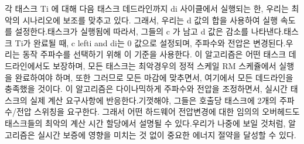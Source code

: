 \documentclass[11pt
  , a4paper
  , article
  , oneside
]{memoir}
\begin{document}
각 태스크 Ti 에 대해 다음 태스크 데드라인까지 di 사이클에서 실행되는 한, 우리는 최악의 시나리오에 보조를 맞추고 있다. 그래서, 우리는 d 값의 합을 사용하여 실행 속도를 설정한다.태스크가 실행됨에 따라서, 그들의 c 가 남고 d 값은 감소를 나타낸다.태스크 Ti가 완료될 때, c lefti and di는 0 값으로 설정되며, 주파수와 전압은 변경된다.우리는 동작 주파수를 선택하기 위해 이 기준을 사용한다. 이 알고리즘은 어떤 태스크 데드라인에서도 보장하며, 모든 태스크는 최악경우의 정적 스케일 RM 스케쥴에서 실행을 완료하여야 하며, 또한 그러므로 모든 마감에 맞추면서, 여기에서 모든 데드라인을 충족했을 것이다.
이 알고리즘은 다이나믹하게 주파수와 전압을 조정하면서, 실시간 태스크의 실제 계산 요구사항에 반응한다.기껏해야, 그들은 호출당 태스크에 2개의 주파수/전압 스위칭을 요구한다. 그래서 어떤 하드웨어 전압변경에 대한 임의의 오버헤드도 태스크들의 최악의 계산 시간 할당에서 설명될 수 있다.우리가 나중에 보일 것처럼, 알고리즘은 실시간 보증에 영향을 미치는 것 없이 중요한 에너지 절약을 달성할 수 있다. 
\end{document}
